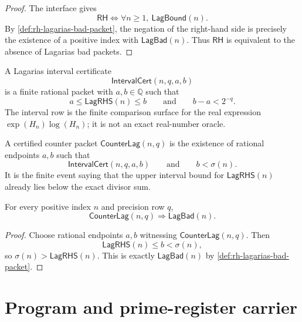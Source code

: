 \begin{proof}
The interface gives
$$
\mathsf{RH}
\Longleftrightarrow
\forall n\geq 1,\ \mathsf{LagBound}(n).
$$
By \autoref{def:rh-lagarias-bad-packet}, the negation of the right-hand
side is precisely the existence of a positive index with
$\mathsf{LagBad}(n)$.  Thus $\mathsf{RH}$ is equivalent to the absence of
Lagarias bad packets.
\end{proof}

\begin{definition}
\label{def:rh-lagarias-interval-certificate}
A Lagarias interval certificate
$$
\mathsf{IntervalCert}(n,q,a,b)
$$
is a finite rational packet with $a,b\in\mathbb Q$ such that
$$
a\leq \mathsf{LagRHS}(n)\leq b
\qquad\text{and}\qquad
b-a<2^{-q}.
$$
The interval row is the finite comparison surface for the real expression
$\exp(H_n)\log(H_n)$; it is not an exact real-number oracle.
\end{definition}

\begin{definition}
\label{def:rh-certified-counter-packet}
A certified counter packet $\mathsf{CounterLag}(n,q)$ is the existence of
rational endpoints $a,b$ such that
$$
\mathsf{IntervalCert}(n,q,a,b)
\qquad\text{and}\qquad
b<\sigma(n).
$$
It is the finite event saying that the upper interval bound for
$\mathsf{LagRHS}(n)$ already lies below the exact divisor sum.
\end{definition}

\begin{proposition}
\label{prop:rh-certified-counter-sound}
For every positive index $n$ and precision row $q$,
$$
\mathsf{CounterLag}(n,q)
\Longrightarrow
\mathsf{LagBad}(n).
$$
\end{proposition}

\begin{proof}
Choose rational endpoints $a,b$ witnessing
$\mathsf{CounterLag}(n,q)$.  Then
$$
\mathsf{LagRHS}(n)\leq b<\sigma(n),
$$
so $\sigma(n)>\mathsf{LagRHS}(n)$.  This is exactly
$\mathsf{LagBad}(n)$ by \autoref{def:rh-lagarias-bad-packet}.
\end{proof}

\section{Program and prime-register carrier}
\label{sec:rh-counterprogram-prime-register-carrier}

